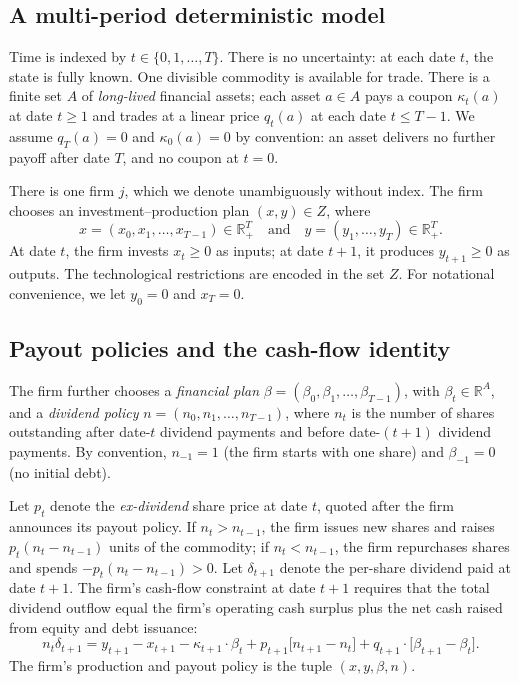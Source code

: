 \documentclass[11pt,a4paper,oneside]{book}
\def\R{\mathbb{R}}
\def\leq{\leqslant}
\def\geq{\geqslant}
\def\et{\quad \text{and} \quad}
\theoremstyle{plain}
\theoremstyle{definition}
\theoremstyle{remark}
\numberwithin{equation}{chapter}
\begin{document}
\subsection{A multi-period deterministic model}

Time is indexed by $t \in \{0, 1, \ldots, T\}$.
There is no uncertainty: at each date $t$, the state is fully known.
One divisible commodity is available for trade.
There is a finite set $A$ of \emph{long-lived} financial assets; each asset $a \in A$ pays a coupon $\kappa_t(a)$ at date $t \geq 1$ and trades at a linear price $q_t(a)$ at each date $t \leq T - 1$.
We assume $q_T(a) = 0$ and $\kappa_0(a) = 0$ by convention: an asset delivers no further payoff after date $T$, and no coupon at $t=0$.

There is one firm $j$, which we denote unambiguously without index.
The firm chooses an investment--production plan $(x, y) \in Z$, where
\begin{equation*}
  x = (x_0, x_1, \ldots, x_{T-1}) \in \R_+^T
  \et
  y = (y_1, \ldots, y_T) \in \R_+^T.
\end{equation*}
At date $t$, the firm invests $x_t \geq 0$ as inputs; at date $t+1$, it produces $y_{t+1} \geq 0$ as outputs.
The technological restrictions are encoded in the set $Z$.
For notational convenience, we let $y_0 = 0$ and $x_T = 0$.

\subsection{Payout policies and the cash-flow identity}

The firm further chooses a \emph{financial plan} $\beta = (\beta_0, \beta_1, \ldots, \beta_{T-1})$, with $\beta_t \in \R^A$, and a \emph{dividend policy} $n = (n_0, n_1, \ldots, n_{T-1})$, where $n_t$ is the number of shares outstanding after date-$t$ dividend payments and before date-$(t+1)$ dividend payments.
By convention, $n_{-1} = 1$ (the firm starts with one share) and $\beta_{-1} = 0$ (no initial debt).

Let $p_t$ denote the \emph{ex-dividend} share price at date $t$, quoted after the firm announces its payout policy.
If $n_t > n_{t-1}$, the firm issues new shares and raises $p_t (n_t - n_{t-1})$ units of the commodity; if $n_t < n_{t-1}$, the firm repurchases shares and spends $-p_t (n_t - n_{t-1}) > 0$.
Let $\delta_{t+1}$ denote the per-share dividend paid at date $t+1$.
The firm's cash-flow constraint at date $t+1$ requires that the total dividend outflow equal the firm's operating cash surplus plus the net cash raised from equity and debt issuance:
\begin{equation}\label{eq:cashflow-identity}
  n_t \delta_{t+1}
  = y_{t+1} - x_{t+1} - \kappa_{t+1} \cdot \beta_t
    + p_{t+1} \bigl[ n_{t+1} - n_t \bigr]
    + q_{t+1} \cdot \bigl[ \beta_{t+1} - \beta_t \bigr].
\end{equation}
The firm's production and payout policy is the tuple $(x, y, \beta, n)$.
\end{document}
